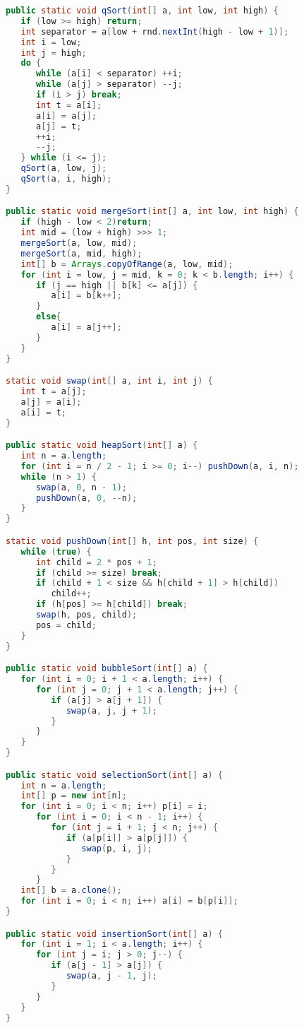 \begin{lstlisting}[language=Java]
public static void qSort(int[] a, int low, int high) {
   if (low >= high) return;
   int separator = a[low + rnd.nextInt(high - low + 1)];
   int i = low;
   int j = high;
   do {
      while (a[i] < separator) ++i;
      while (a[j] > separator) --j;
      if (i > j) break;
      int t = a[i];
      a[i] = a[j];
      a[j] = t;
      ++i;
      --j;
   } while (i <= j);
   qSort(a, low, j);
   qSort(a, i, high);
}

public static void mergeSort(int[] a, int low, int high) {
   if (high - low < 2)return;
   int mid = (low + high) >>> 1;
   mergeSort(a, low, mid);
   mergeSort(a, mid, high);
   int[] b = Arrays.copyOfRange(a, low, mid);
   for (int i = low, j = mid, k = 0; k < b.length; i++) {
      if (j == high || b[k] <= a[j]) {
         a[i] = b[k++];
      } 
      else{
         a[i] = a[j++];
      }
   }
}

static void swap(int[] a, int i, int j) {
   int t = a[j];
   a[j] = a[i];
   a[i] = t;
}

public static void heapSort(int[] a) {
   int n = a.length;
   for (int i = n / 2 - 1; i >= 0; i--) pushDown(a, i, n);
   while (n > 1) {
      swap(a, 0, n - 1);
      pushDown(a, 0, --n);
   }
}

static void pushDown(int[] h, int pos, int size) {
   while (true) {
      int child = 2 * pos + 1;
      if (child >= size) break;
      if (child + 1 < size && h[child + 1] > h[child])
         child++;
      if (h[pos] >= h[child]) break;
      swap(h, pos, child);
      pos = child;
   }
}

public static void bubbleSort(int[] a) {
   for (int i = 0; i + 1 < a.length; i++) {
      for (int j = 0; j + 1 < a.length; j++) {
         if (a[j] > a[j + 1]) {
            swap(a, j, j + 1);
         }
      }
   }
}

public static void selectionSort(int[] a) {
   int n = a.length;
   int[] p = new int[n];
   for (int i = 0; i < n; i++) p[i] = i;
      for (int i = 0; i < n - 1; i++) {
         for (int j = i + 1; j < n; j++) {
            if (a[p[i]] > a[p[j]]) {
               swap(p, i, j);
            }
         }
      }
   int[] b = a.clone();
   for (int i = 0; i < n; i++) a[i] = b[p[i]];
}

public static void insertionSort(int[] a) {
   for (int i = 1; i < a.length; i++) {
      for (int j = i; j > 0; j--) {
         if (a[j - 1] > a[j]) {
            swap(a, j - 1, j);
         }
      }
   }
}


\end{lstlisting}
